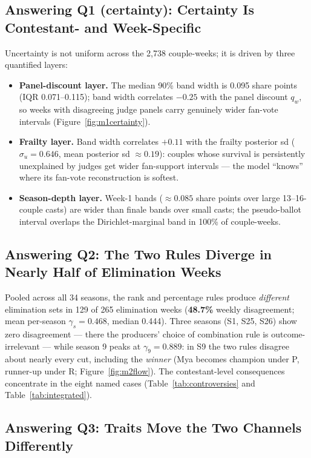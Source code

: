 \documentclass[10pt]{article}
\begin{document}
\subsection{Answering Q1 (certainty): Certainty Is Contestant- and Week-Specific}

Uncertainty is not uniform across the 2{,}738 couple-weeks; it is driven by three
quantified layers:

\begin{itemize}[itemsep=1pt]
\item \textbf{Panel-discount layer.} The median 90\% band width is 0.095 share points
(IQR 0.071--0.115); band width correlates $-0.25$ with the panel discount $q_w$, so weeks
with disagreeing judge panels carry genuinely wider fan-vote intervals
(Figure~\ref{fig:m1certainty}).
\item \textbf{Frailty layer.} Band width correlates $+0.11$ with the frailty posterior sd
($\sigma_u = 0.646$, mean posterior sd $\approx 0.19$): couples whose survival is
persistently unexplained by judges get wider fan-support intervals --- the model
``knows'' where its fan-vote reconstruction is softest.
\item \textbf{Season-depth layer.} Week-1 bands ($\approx 0.085$ share points over large
13--16-couple casts) are wider than finale bands over small casts; the pseudo-ballot
interval overlaps the Dirichlet-marginal band in 100\% of couple-weeks.
\end{itemize}

\subsection{Answering Q2: The Two Rules Diverge in Nearly Half of Elimination Weeks}

Pooled across all 34 seasons, the rank and percentage rules produce \emph{different}
elimination sets in 129 of 265 elimination weeks (\textbf{48.7\%} weekly disagreement;
mean per-season $\gamma_s = 0.468$, median 0.444). Three seasons (S1, S25, S26) show zero
disagreement --- there the producers' choice of combination rule is outcome-irrelevant ---
while season 9 peaks at $\gamma_9 = 0.889$: in S9 the two rules disagree about nearly every
cut, including the \emph{winner} (Mya becomes champion under P, runner-up under R;
Figure~\ref{fig:m2flow}). The contestant-level consequences concentrate in the eight named
cases (Table~\ref{tab:controversies} and Table~\ref{tab:integrated}).

\subsection{Answering Q3: Traits Move the Two Channels Differently}
\end{document}
